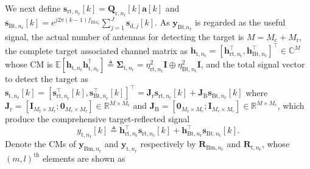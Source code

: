\documentclass[9pt,journal]{IEEEtran}
\newcommand{\paren}[1]{\left({#1}\right)}
\newcommand{\bracket}[1]{{\left [{#1}\right ]}}
\newcommand{\ith}[1]    {{#1}^{\underline{\text{th}}}}
\newcommand{\rr}{_\mathrm{r}}
\newcommand{\cc}{_\mathrm{c}}
\newcommand{\target}{\mathrm{t}}
\newcommand{\MM}{\mathit{M}}
\newcommand{\stnrk}{\mathbf{s}_{\textrm{t},n_{\textrm{r}}}\bracket{k}}
\newcommand{\srtnrk}{\mathbf{s}_{\textrm{rt},n_{\textrm{r}}}\bracket{k}}
\newcommand{\sBtnrk}{\mathbf{s}_{\textrm{Bt},n_{\textrm{r}}}\bracket{k}}
\begin{document}
We next define $\mathbf{s}_{\mathrm{rt,}n\rr}\bracket{k}=\mathbf{Q}_{\mathrm{r,}n\rr}\bracket{k}\mathbf{a}\bracket{k}$ and $\mathbf{s}_{\mathrm{Bt},n\rr}\bracket{k}=e^{j2\pi\paren{k-1} f_{\mathrm{Bt}n_\mathrm{r}}}
\sum_{j=1}^\mathit{J}\mathbf{s}_{\textrm{d},j}\bracket{k}$. As $\mathbf{y}_{\textrm{Bt,}n\rr}$ is regarded as the useful signal, the actual number of antennas for detecting the target is $\mathit{M}=\mathit{M}\cc+\MM\rr$, the complete target associated channel matrix as $\mathbf{h}_{\target,n\rr}=\bracket{\mathbf{h}^\top_{\textrm{rt},n\rr},\mathbf{h}^\top_{\textrm{Bt},n\rr}}^\top\in\mathbb{C}^{\mathit{M}}$ whose CM is $\mathbb{E}\bracket{\mathbf{h}_{\target,n\rr}\mathbf{h}^\dagger_{\target,n\rr}}\triangleq\boldsymbol{\Sigma}_{\target,n\rr}=\eta^2_{\textrm{rt},n\rr}\mathbf{I}\oplus\eta^2_{\textrm{Bt},n\rr}\mathbf{I}$, and the total signal vector to detect the target as $\stnrk=\bracket{\mathbf{s}^\top_{\textrm{rt},n\rr}\bracket{k},\mathbf{s}^\top_{\textrm{Bt},n\rr}\bracket{k}}^\top=\mathbf{J}_{\textrm{r}}\srtnrk+\mathbf{J}_{\textrm{B}}\sBtnrk$ where $\mathbf{J}_{\textrm{r}}=\bracket{\mathbf{I}_{\mathit{M}\rr\times \mathit{M}\rr};\mathbf{0}_{\mathit{M}\cc\times \mathit{M}\rr}}\in\mathbb{R}^{\mathbf{\mathit{M}\times \mathit{M}\rr}}$ and $\mathbf{J}_{\textrm{B}}=\bracket{\mathbf{0}_{\mathit{M}\rr\times \mathit{M}\cc};\mathbf{I}_{\mathit{M}\cc\times \mathit{M}\cc}}\in\mathbb{R}^{\mathbf{\mathit{M}\times \mathit{M}\cc}}$, which produce the comprehensive target-reflected signal $$y_{\target,n\rr}\bracket{k}\triangleq\mathbf{h}^\top_{\textrm{rt},n\rr}\mathbf{s}_{\textrm{rt},n\rr}\bracket{k}+\mathbf{h}^\top_{\textrm{Bt},n\rr}\mathbf{s}_{\textrm{Bt},n\rr}\bracket{k}.$$ Denote the CMs of $\mathbf{y}_{\mathrm{Bm},n\rr}$ and $\mathbf{y}_{\mathrm{t},n\rr}$ respectively by $\mathbf{R}_{\textrm{Bm},n\rr}$ and $\mathbf{R}_{\textrm{t},n\rr}$, whose $\ith{\paren{m,l}}$ elements are shown as \par\noindent\small
\end{document}
